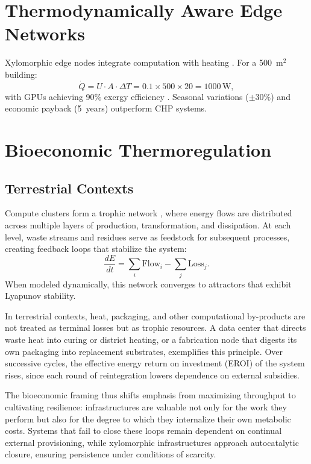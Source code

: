 \documentclass[11pt,a4paper]{article}
\theoremstyle{plain}
\theoremstyle{definition}
\theoremstyle{remark}
\begin{document}
\section{Thermodynamically Aware Edge Networks}
\label{sec:edge}

Xylomorphic edge nodes integrate computation with heating
\citep{stockholm2020}. For a 500~m$^2$ building:
\[
  \dot{Q} = U \cdot A \cdot \Delta T = 0.1 \times 500 \times 20 = 1000\,\mathrm{W},
\]
with GPUs achieving 90\% exergy efficiency \citep{bennett1982}. Seasonal
variations ($\pm 30\%$) and economic payback (5~years) outperform CHP systems.

\section{Bioeconomic Thermoregulation}
\label{sec:bioeconomic}

\subsection{Terrestrial Contexts}

Compute clusters form a trophic network \citep{odum1994}, where energy flows
are distributed across multiple layers of production, transformation, and
dissipation. At each level, waste streams and residues serve as feedstock for
subsequent processes, creating feedback loops that stabilize the system:
\[
  \frac{dE}{dt} = \sum_i \mathrm{Flow}_i - \sum_j \mathrm{Loss}_j.
\]
When modeled dynamically, this network converges to attractors that exhibit
Lyapunov stability.

In terrestrial contexts, heat, packaging, and other computational by-products
are not treated as terminal losses but as trophic resources. A data center that
directs waste heat into curing or district heating, or a fabrication node that
digests its own packaging into replacement substrates, exemplifies this
principle. Over successive cycles, the effective energy return on investment
(EROI) of the system rises, since each round of reintegration lowers dependence
on external subsidies.

The bioeconomic framing thus shifts emphasis from maximizing throughput to
cultivating resilience: infrastructures are valuable not only for the work they
perform but also for the degree to which they internalize their own metabolic
costs. Systems that fail to close these loops remain dependent on continual
external provisioning, while xylomorphic infrastructures approach autocatalytic
closure, ensuring persistence under conditions of scarcity.
\end{document}
